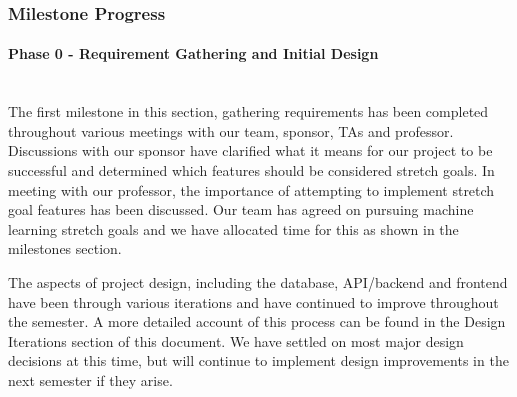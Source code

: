 \subsubsection{Milestone Progress}
\paragraph{Phase 0 - Requirement Gathering and Initial Design} \mbox{}\\[\paragraphheaderspace]
The first milestone in this section, gathering requirements has been completed throughout various meetings with our team, sponsor, TAs and professor. Discussions with our sponsor have clarified what it means for our project to be successful and determined which features should be considered stretch goals. In meeting with our professor, the importance of attempting to implement stretch goal features has been discussed. Our team has agreed on pursuing machine learning stretch goals and we have allocated time for this as shown in the milestones section.\par
The aspects of project design, including the database, API/backend and frontend have been through various iterations and have continued to improve throughout the semester. A more detailed account of this process can be found in the Design Iterations section of this document. We have settled on most major design decisions at this time, but will continue to implement design improvements in the next semester if they arise.\par
